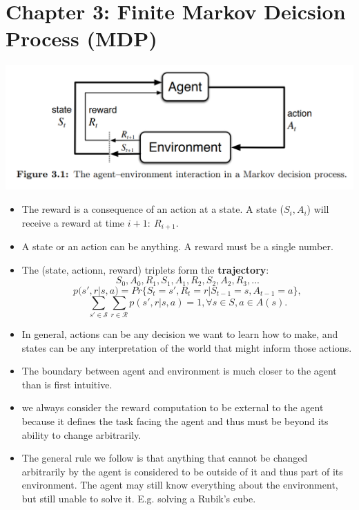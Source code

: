 \graphicspath{{./chapter3/}}

\section{Chapter 3: Finite Markov Deicsion Process (MDP)}

\includegraphics[scale=0.4]{./MDP.png}

\begin{itemize}
\item The reward is a consequence of an action at a state. A state (\(S_i, A_i\)) will receive a reward at time \(i+1:\ R_{i+1}\). 
\item A state or an action can be anything. A reward must be a single number. 
\item The (state, actionn, reward) triplets form the \textbf{trajectory}: 
\subitem 
\begin{equation}
    S_0, A_0, R_1, S_1, A_1, R_2, S_2, A_2, R_3,...
\end{equation}
\subitem
\begin{equation}
    p(s', r|s, a) = Pr\{S_t =s', R_t =r | S_{t-1} = s, A_{t-1} =a\},
\label{eq:four_argument_p}
\end{equation}
\subitem
\begin{equation}
    \sum_{s' \in \mathcal{S}}\sum_{r \in \mathcal{R}} p(s', r|s, a) = 1, \forall s \in S, a \in A(s).
\end{equation}

\item In general, actions can be any decision we want to learn how to make, and states can be
any interpretation of the world that might inform those actions.
\item The boundary between agent and environment is much closer to the agent than is first
intuitive. 
\item  we always consider the reward
computation to be external to the agent because it defines the task facing the agent and
thus must be beyond its ability to change arbitrarily. 
\item The general rule we follow is that anything that cannot be changed arbitrarily by
the agent is considered to be outside of it and thus part of its environment. The agent may still know everything about the environment, but still unable to solve it. E.g. solving a Rubik's cube.

\end{itemize}

